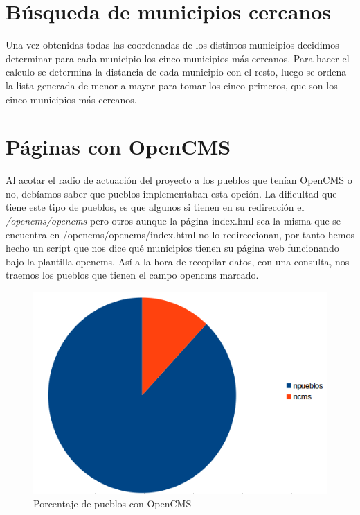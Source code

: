 \section{Búsqueda de municipios cercanos}

Una vez obtenidas todas las coordenadas de los distintos municipios decidimos determinar para cada municipio los cinco municipios más cercanos. Para hacer el calculo se determina la distancia de cada municipio con el resto, luego se ordena la lista generada de menor a mayor para tomar los cinco primeros, que son los cinco municipios más cercanos.

\section{Páginas con OpenCMS}

Al acotar el radio de actuación del proyecto a los pueblos que tenían OpenCMS o no, debíamos saber que pueblos implementaban esta opción. La dificultad que tiene este tipo de pueblos, es que algunos si tienen en su redirección el \textit{/opencms/opencms} pero otros aunque la página index.hml sea la misma que se encuentra en /opencms/opencms/index.html no lo redireccionan, por tanto hemos hecho un script que nos dice qué municipios tienen su página web funcionando bajo la plantilla opencms. Así a la hora de recopilar datos, con una consulta, nos traemos los pueblos que tienen el campo opencms marcado.


\begin{figure}
\centering
\includegraphics[scale=0.5]{./obdat/imagenes/cms.png}
\caption{Porcentaje de pueblos con OpenCMS}
\label{fig:openCMS}
\end{figure}

